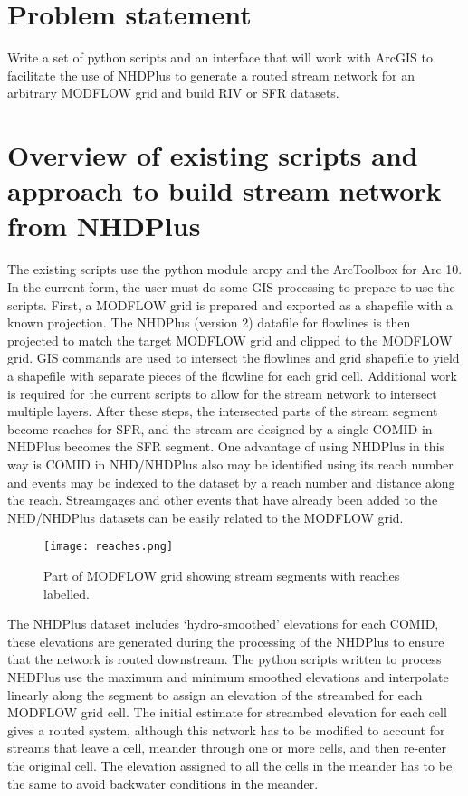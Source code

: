 \documentclass[12pt,letterpaper]{article}
\begin{document}
\section{Problem statement}
Write a set of python scripts and an interface that will work with ArcGIS to facilitate the use of NHDPlus to generate a routed stream network for an arbitrary MODFLOW grid and build RIV or SFR datasets.  


\section{Overview of existing scripts and approach to build stream network from NHDPlus}
The existing scripts use the python module arcpy and the ArcToolbox for Arc 10.  In the current
form, the user must do some GIS processing to prepare to use the scripts. First, a MODFLOW grid
is prepared and exported as a shapefile with a known projection. The NHDPlus (version 2)
datafile for flowlines is then projected to match the target MODFLOW grid
and clipped to the MODFLOW grid.  GIS commands are used to intersect the flowlines and 
grid shapefile to yield a shapefile with separate pieces of the flowline for each 
grid cell. Additional work is required for the current scripts to allow
for the stream network to intersect multiple layers. After these steps, 
the intersected parts of the stream segment become reaches for SFR, and the stream arc designed by a single
COMID in NHDPlus becomes the SFR segment.  One advantage of using NHDPlus in this way is 
COMID in NHD/NHDPlus also may be identified using its reach number and events may be
indexed to the dataset by a reach number and distance along the reach.  Streamgages and
other events that have already been added to the NHD/NHDPlus datasets can be easily
related to the MODFLOW grid.

\begin{figure}[ht]
	\centering		  \texttt{[image: reaches.png]}
	\caption{Part of MODFLOW grid showing stream segments with reaches labelled.}
	\label{fig:reaches}
\end{figure}

The NHDPlus dataset includes `hydro-smoothed' elevations for each COMID, these elevations are 
generated during the processing of the NHDPlus to ensure that the network is routed downstream. The
python scripts written to process NHDPlus use the maximum and minimum smoothed elevations and 
interpolate linearly along the segment to assign an elevation of the streambed for each MODFLOW
grid cell.  The initial estimate for streambed elevation for each cell gives a routed system, although
this network has to be modified to account for streams that leave a cell, meander through one or
more cells, and then re-enter the original cell.  The elevation assigned to all the cells in the
meander has to be the same to avoid backwater conditions in the meander.
\end{document}
